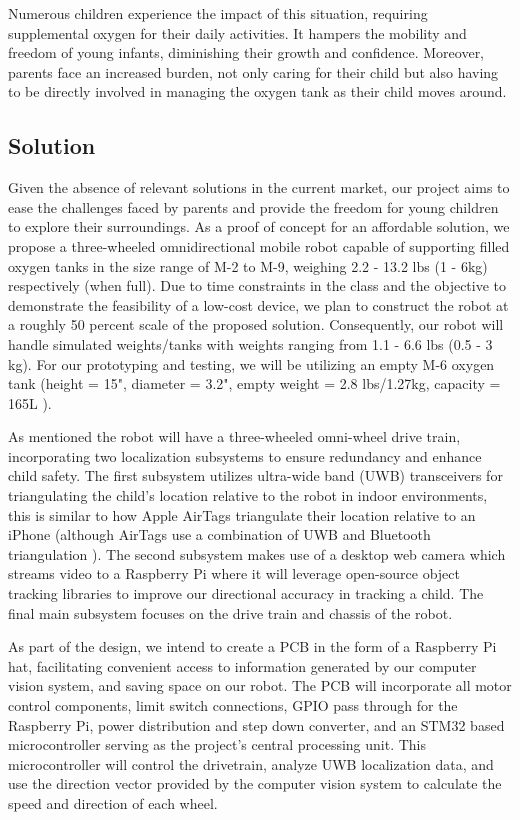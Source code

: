 \documentclass[journal,onecolumn, draftclsnofoot, 12pt]{IEEEtran}
\begin{document}
Numerous children experience the impact of this situation, requiring supplemental oxygen for their daily activities. It hampers the mobility and freedom of young infants, diminishing their growth and confidence. Moreover, parents face an increased burden, not only caring for their child but also having to be directly involved in managing the oxygen tank as their child moves around.

\subsection{Solution}
Given the absence of relevant solutions in the current market, our project aims to ease the challenges faced by parents and provide the freedom for young children to explore their surroundings. As a proof of concept for an affordable solution, we propose a three-wheeled omnidirectional mobile robot capable of supporting filled oxygen tanks in the size range of M-2 to M-9, weighing 2.2 - 13.2 lbs (1 - 6kg) respectively (when full). Due to time constraints in the class and the objective to demonstrate the feasibility of a low-cost device, we plan to construct the robot at a roughly 50 percent scale of the proposed solution. Consequently, our robot will handle simulated weights/tanks with weights ranging from 1.1 - 6.6 lbs (0.5 - 3 kg). For our prototyping and testing, we will be utilizing an empty M-6 oxygen tank (height = 15", diameter = 3.2", empty weight = 2.8 lbs/1.27kg, capacity = 165L \cite{oxygen_tank_sizes}).

As mentioned the robot will have a three-wheeled omni-wheel drive train, incorporating two localization subsystems to ensure redundancy and enhance child safety. The first subsystem utilizes ultra-wide band (UWB) transceivers for triangulating the child's location relative to the robot in indoor environments, this is similar to how Apple AirTags triangulate their location relative to an iPhone \cite{airtag_uwb} (although AirTags use a combination of UWB and Bluetooth triangulation \cite{airtag_ble}). The second subsystem makes use of a desktop web camera which streams video to a Raspberry Pi where it will leverage open-source object tracking libraries to improve our directional accuracy in tracking a child. The final main subsystem focuses on the drive train and chassis of the robot.

As part of the design, we intend to create a PCB in the form of a Raspberry Pi hat, facilitating convenient access to information generated by our computer vision system, and saving space on our robot. The PCB will incorporate all motor control components, limit switch connections, GPIO pass through for the Raspberry Pi, power distribution and step down converter, and an STM32 based microcontroller serving as the project's central processing unit. This microcontroller will control the drivetrain, analyze UWB localization data, and use the direction vector provided by the computer vision system to calculate the speed and direction of each wheel.
\end{document}
